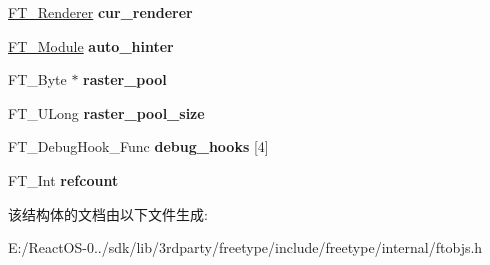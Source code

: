\begin{DoxyCompactItemize}
\hyperlink{struct_f_t___renderer_rec__}{F\+T\+\_\+\+Renderer} {\bfseries cur\+\_\+renderer}
\item 
\mbox{\label{struct_f_t___library_rec___ae608b33b223905d4d70b782ed7ec8c78}} 
\hyperlink{struct_f_t___module_rec__}{F\+T\+\_\+\+Module} {\bfseries auto\+\_\+hinter}
\item 
\mbox{\label{struct_f_t___library_rec___aa8dd799d2efb7817b05c4a02a6828275}} 
F\+T\+\_\+\+Byte $\ast$ {\bfseries raster\+\_\+pool}
\item 
\mbox{\label{struct_f_t___library_rec___a798afdcaf0cda349eb454b769abfa251}} 
F\+T\+\_\+\+U\+Long {\bfseries raster\+\_\+pool\+\_\+size}
\item 
\mbox{\label{struct_f_t___library_rec___a1ba1f5abd0254a22dae533a9ac971b84}} 
F\+T\+\_\+\+Debug\+Hook\+\_\+\+Func {\bfseries debug\+\_\+hooks} \mbox{[}4\mbox{]}
\item 
\mbox{\label{struct_f_t___library_rec___a9c8e4e2bde3862cf3eb8011f4ce1dadb}} 
F\+T\+\_\+\+Int {\bfseries refcount}
\end{DoxyCompactItemize}


该结构体的文档由以下文件生成\+:\begin{DoxyCompactItemize}
\item 
E\+:/\+React\+O\+S-\/0../sdk/lib/3rdparty/freetype/include/freetype/internal/ftobjs.\+h\end{DoxyCompactItemize}
